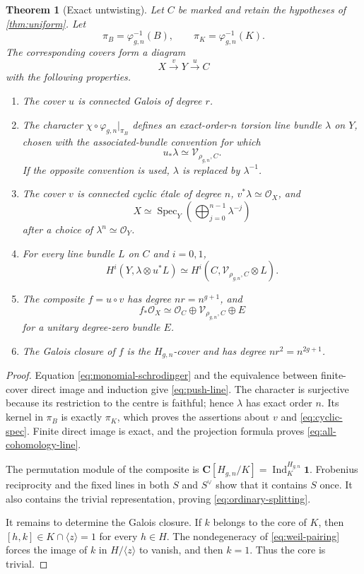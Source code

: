 \documentclass[11pt,reqno]{amsart}
\numberwithin{equation}{section}
\newtheorem{theorem}{Theorem}[section]
\theoremstyle{remark}
\DeclareMathOperator{\Ind}{Ind}
\DeclareMathOperator{\Spec}{Spec}
\newcommand{\cO}{\mathcal O}
\newcommand{\cV}{\mathcal V}
\newcommand{\bC}{\mathbf C}
\begin{document}
\begin{theorem}[Exact untwisting]\label{thm:exact-untwisting}
Let \(C\) be marked and retain the hypotheses of \cref{thm:uniform}.
Let
\[
 \pi_B=\varphi_{g,n}^{-1}(B),\qquad
 \pi_K=\varphi_{g,n}^{-1}(K).
\]
The corresponding covers form a diagram
\[
 X\xrightarrow{\,v\,}Y\xrightarrow{\,u\,}C
\tag{4.5}\label{eq:untwisting-diagram}
\]
with the following properties.
\begin{enumerate}[label=\textup{(\alph*)}]
\item The cover \(u\) is connected Galois of degree \(r\).
\item The character \(\chi\circ\varphi_{g,n}|_{\pi_B}\) defines an
exact-order-\(n\) torsion line bundle \(\lambda\) on \(Y\), chosen with
the associated-bundle convention for which
\[
 u_*\lambda\simeq\cV_{\rho_{g,n},C}.
\tag{4.6}\label{eq:push-line}
\]
If the opposite convention is used, \(\lambda\) is replaced by
\(\lambda^{-1}\).
\item The cover \(v\) is connected cyclic \'etale of degree \(n\),
\(v^*\lambda\simeq\cO_X\), and
\[
 X\simeq
 \Spec_Y\!\left(\bigoplus_{j=0}^{n-1}\lambda^{-j}\right)
\tag{4.7}\label{eq:cyclic-spec}
\]
after a choice of \(\lambda^n\simeq\cO_Y\).
\item For every line bundle \(L\) on \(C\) and \(i=0,1\),
\[
 H^i(Y,\lambda\otimes u^*L)
 \simeq H^i(C,\cV_{\rho_{g,n},C}\otimes L).
\tag{4.8}\label{eq:all-cohomology-line}
\]
\item The composite \(f=u\circ v\) has degree \(nr=n^{g+1}\), and
\[
 f_*\cO_X\simeq
 \cO_C\oplus\cV_{\rho_{g,n},C}\oplus E
\tag{4.9}\label{eq:ordinary-splitting}
\]
for a unitary degree-zero bundle \(E\).
\item The Galois closure of \(f\) is the \(H_{g,n}\)-cover and has degree
\(nr^2=n^{2g+1}\).
\end{enumerate}
\end{theorem}

\begin{proof}
Equation \eqref{eq:monomial-schrodinger} and the equivalence between
finite-cover direct image and induction give \eqref{eq:push-line}.  The
character is surjective because its restriction to the centre is
faithful; hence \(\lambda\) has exact order \(n\).  Its kernel in
\(\pi_B\) is exactly \(\pi_K\), which proves the assertions about \(v\)
and \eqref{eq:cyclic-spec}.  Finite direct image is exact, and the
projection formula proves \eqref{eq:all-cohomology-line}.

The permutation module of the composite is
\(\bC[H_{g,n}/K]=\Ind_K^{H_{g,n}}\mathbf1\).  Frobenius reciprocity and
the fixed lines in both \(S\) and \(S^\vee\) show that it contains
\(S\) once.  It also contains the trivial representation, proving
\eqref{eq:ordinary-splitting}.

It remains to determine the Galois closure.  If \(k\) belongs to the core
of \(K\), then \([h,k]\in K\cap\langle z\rangle=1\) for every \(h\in H\).
The nondegeneracy of \eqref{eq:weil-pairing} forces the image of \(k\) in
\(H/\langle z\rangle\) to vanish, and then \(k=1\).  Thus the core is
trivial.
\end{proof}
\end{document}
